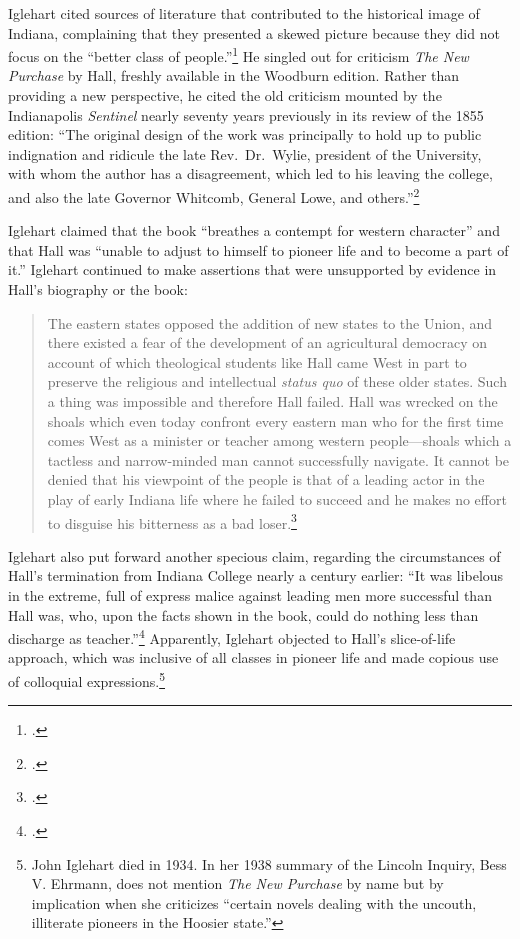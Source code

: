 \documentclass[
  american,
  letterpaper,
]{scrreprt}
\begin{document}
Iglehart cited sources of literature that contributed to the historical
image of Indiana, complaining that they presented a skewed picture
because they did not focus on the ``better class of people.''\footnote{.} He singled out for criticism \emph{The New Purchase} by Hall,
freshly available in the Woodburn edition. Rather than providing a new
perspective, he cited the old criticism mounted by the Indianapolis
\emph{Sentinel} nearly seventy years previously in its review of the
1855 edition: ``The original design of the work was principally to hold
up to public indignation and ridicule the late Rev.~Dr.~Wylie, president
of the University, with whom the author has a disagreement, which led to
his leaving the college, and also the late Governor Whitcomb, General
Lowe, and others.''\footnote{.}

Iglehart claimed that the book ``breathes a contempt for western
character'' and that Hall was ``unable to adjust to himself to pioneer
life and to become a part of it.'' Iglehart continued to make assertions
that were unsupported by evidence in Hall's biography or the book:

\begin{quote}
The eastern states opposed the addition of new states to the Union, and
there existed a fear of the development of an agricultural democracy on
account of which theological students like Hall came West in part to
preserve the religious and intellectual \emph{status quo} of these older
states. Such a thing was impossible and therefore Hall failed. Hall was
wrecked on the shoals which even today confront every eastern man who
for the first time comes West as a minister or teacher among western
people---shoals which a tactless and narrow-minded man cannot
successfully navigate. It cannot be denied that his viewpoint of the
people is that of a leading actor in the play of early Indiana life
where he failed to succeed and he makes no effort to disguise his
bitterness as a bad loser.\footnote{.}
\end{quote}

Iglehart also put forward another specious claim, regarding the
circumstances of Hall's termination from Indiana College nearly a
century earlier: ``It was libelous in the extreme, full of express
malice against leading men more successful than Hall was, who, upon the
facts shown in the book, could do nothing less than discharge as
teacher.''\footnote{.}
Apparently, Iglehart objected to Hall's slice-of-life approach, which
was inclusive of all classes in pioneer life and made copious use of
colloquial expressions.\footnote{John Iglehart died in 1934. In her 1938
  summary of the Lincoln Inquiry, Bess V. Ehrmann,
   does not mention
  \emph{The New Purchase} by name but by implication when she criticizes
  ``certain novels dealing with the uncouth, illiterate pioneers in the
  Hoosier state.''}
\end{document}
